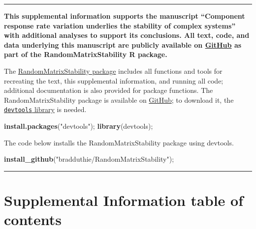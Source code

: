 \documentclass[]{article}
\newenvironment{Shaded}{\begin{snugshade}}{\end{snugshade}}
\newcommand{\KeywordTok}[1]{\textcolor[rgb]{0.13,0.29,0.53}{\textbf{{#1}}}}
\newcommand{\StringTok}[1]{\textcolor[rgb]{0.31,0.60,0.02}{{#1}}}
\newcommand{\NormalTok}[1]{{#1}}
\begin{document}
\vspace{2mm}
\hrule
\vspace{2mm}

\textbf{This supplemental information supports the manuscript
``Component response rate variation underlies the stability of complex
systems'' with additional analyses to support its conclusions. All text,
code, and data underlying this manuscript are publicly available on
\href{https://github.com/bradduthie/RandomMatrixStability}{GitHub} as
part of the RandomMatrixStability R package.}

The
\href{https://github.com/bradduthie/RandomMatrixStability}{RandomMatrixStability
package} includes all functions and tools for recreating the text, this
supplemental information, and running all code; additional documentation
is also provided for package functions. The RandomMatrixStability
package is available on
\href{https://github.com/bradduthie/RandomMatrixStability}{GitHub}; to
download it, the
\href{https://cran.r-project.org/web/packages/devtools/index.html}{\texttt{devtools}
library} is needed.

\begin{Shaded}
\begin{Highlighting}[]
\KeywordTok{install.packages}\NormalTok{(}\StringTok{"devtools"}\NormalTok{);}
\KeywordTok{library}\NormalTok{(devtools);}
\end{Highlighting}
\end{Shaded}

The code below installs the RandomMatrixStability package using
devtools.

\begin{Shaded}
\begin{Highlighting}[]
\KeywordTok{install_github}\NormalTok{(}\StringTok{"bradduthie/RandomMatrixStability"}\NormalTok{);}
\end{Highlighting}
\end{Shaded}

\vspace{2mm}
\hrule
\vspace{2mm}

\section{Supplemental Information table of
contents}\label{supplemental-information-table-of-contents}
\end{document}

